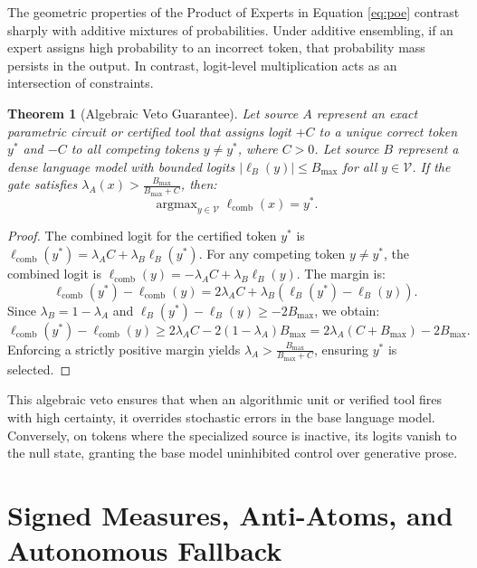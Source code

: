 \documentclass[preprint,12pt]{elsarticle}
\newtheorem{theorem}{Theorem}
\begin{document}
The geometric properties of the Product of Experts in Equation \eqref{eq:poe} contrast sharply with additive mixtures of probabilities. Under additive ensembling, if an expert assigns high probability to an incorrect token, that probability mass persists in the output. In contrast, logit-level multiplication acts as an intersection of constraints.

\begin{theorem}[Algebraic Veto Guarantee]
Let source $A$ represent an exact parametric circuit or certified tool that assigns logit $+C$ to a unique correct token $y^*$ and $-C$ to all competing tokens $y \neq y^*$, where $C > 0$. Let source $B$ represent a dense language model with bounded logits $|\ell_B(y)| \le B_{\max}$ for all $y \in \mathcal{V}$. If the gate satisfies $\lambda_A(x) > \frac{B_{\max}}{B_{\max} + C}$, then:
\begin{equation}
\operatorname{argmax}_{y \in \mathcal{V}} \ell_{\mathrm{comb}}(x) = y^*.
\end{equation}
\end{theorem}

\begin{proof}
The combined logit for the certified token $y^*$ is $\ell_{\mathrm{comb}}(y^*) = \lambda_A C + \lambda_B \ell_B(y^*)$. For any competing token $y \neq y^*$, the combined logit is $\ell_{\mathrm{comb}}(y) = -\lambda_A C + \lambda_B \ell_B(y)$. The margin is:
\begin{equation}
\ell_{\mathrm{comb}}(y^*) - \ell_{\mathrm{comb}}(y) = 2 \lambda_A C + \lambda_B (\ell_B(y^*) - \ell_B(y)).
\end{equation}
Since $\lambda_B = 1 - \lambda_A$ and $\ell_B(y^*) - \ell_B(y) \ge -2 B_{\max}$, we obtain:
\begin{equation}
\ell_{\mathrm{comb}}(y^*) - \ell_{\mathrm{comb}}(y) \ge 2 \lambda_A C - 2(1 - \lambda_A) B_{\max} = 2 \lambda_A (C + B_{\max}) - 2 B_{\max}.
\end{equation}
Enforcing a strictly positive margin yields $\lambda_A > \frac{B_{\max}}{B_{\max} + C}$, ensuring $y^*$ is selected.
\end{proof}

This algebraic veto ensures that when an algorithmic unit or verified tool fires with high certainty, it overrides stochastic errors in the base language model. Conversely, on tokens where the specialized source is inactive, its logits vanish to the null state, granting the base model uninhibited control over generative prose.

\section{Signed Measures, Anti-Atoms, and Autonomous Fallback}
\end{document}
